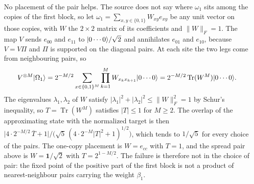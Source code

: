 \documentclass{article}
\begin{document}
No placement of the pair helps. The source does not say where $\omega_1$ sits
among the copies of the first block, so let $\omega_1=\sum_{x,y\in\{0,1\}}W_{xy}e_{xy}$
be any unit vector on those copies, with $W$ the $2\times2$ matrix of its
coefficients and $\lVert W\rVert_F=1$. The map $V$ sends $e_{00}$ and $e_{11}$ to
$|0\cdots0\rangle/\sqrt2$ and annihilates $e_{01}$ and $e_{10}$, because $V=V\Pi$ and
$\Pi$ is supported on the diagonal pairs. At each site the two legs come from
neighbouring pairs, so
\begin{align*}
    V^{\otimes M}|\Omega_1\rangle
        =2^{-M/2}\sum_{x\in\{0,1\}^M}\prod_{k=1}^MW_{x_kx_{k+1}}|0\cdots0\rangle
    =2^{-M/2}\operatorname{Tr}(W^M)|0\cdots0\rangle.
\end{align*}
The eigenvalues $\lambda_1,\lambda_2$ of $W$ satisfy
$\lvert\lambda_1\rvert^2+\lvert\lambda_2\rvert^2\leq\lVert W\rVert_F^2=1$
by Schur's inequality, so $T=\operatorname{Tr}(W^M)$ satisfies
$\lvert T\rvert\leq1$ for $M\geq2$. The overlap of the approximating state with the
normalized target is then
$\bigl\lvert4\cdot2^{-M/2}\,\overline T+1\bigr\rvert/
    \bigl(\sqrt5\,(4\cdot2^{-M}\lvert T\rvert^2+1)^{1/2}\bigr)$, which tends to
$1/\sqrt5$ for every choice of the pairs. The one-copy placement is $W=e_{cc}$ with
$T=1$, and the spread pair above is $W=\mathbf 1/\sqrt2$ with $T=2^{1-M/2}$. The
failure is therefore not in the choice of pair: the fixed point of the positive part
of the first block is not a product of nearest-neighbour pairs carrying the weight
$\beta_1$.
\end{document}
